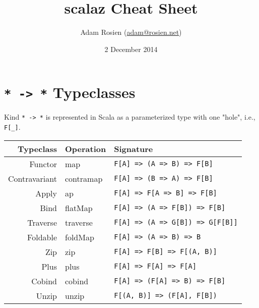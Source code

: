 \documentclass{tufte-handout}
\title{scalaz Cheat Sheet}
\author[Adam Rosien]{Adam Rosien (\href{mailto:adam@rosien.net}{adam@rosien.net})}
\date{2 December 2014}  %
\begin{document}
\maketitle%


\section{\texttt{* -> *} Typeclasses}\label{sec:sigs}

Kind \texttt{* -> *} is represented in Scala as a parameterized type with one "hole", i.e., \texttt{F[\_]}.

\begin{table}[ht]
  \centering
  \selectfont
  \begin{tabular}{rll}
    Typeclass & Operation & Signature \\
    \midrule
    Functor       & map & \texttt{F[A] => (A => B) => F[B]} \\
    Contravariant & contramap & \texttt{F[A] => (B => A) => F[B]} \\
    Apply         & ap & \texttt{F[A] => F[A => B] => F[B]} \\
    Bind          & flatMap & \texttt{F[A] => (A => F[B]) => F[B]} \\
    Traverse      & traverse & \texttt{F[A] => (A => G[B]) => G[F[B]]} \\
    Foldable      & foldMap & \texttt{F[A] => (A => B) => B} \\
    Zip           & zip & \texttt{F[A] => F[B] => F[(A, B)]} \\
    Plus          & plus & \texttt{F[A] => F[A] => F[A]} \\
    Cobind        & cobind & \texttt{F[A] => (F[A] => B) => F[B]} \\
    Unzip         & unzip & \texttt{F[(A, B)] => (F[A], F[B])} \\
  \end{tabular}
  \label{tab:normaltab}
\end{table}
\end{document}
